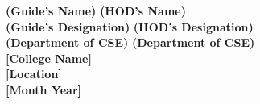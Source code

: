 \documentclass[12pt, a4paper]{report}
\begin{document}
\begin{titlepage}
\begin{center}
\vspace{0.1in}
\textbf{(Guide's Name)} \hspace{2.7in} \textbf{(HOD's Name)}\\
\vspace{0.1in}
\textbf{(Guide's Designation)} \hspace{2in} \textbf{(HOD's Designation)}\\
\vspace{0.1in}
\textbf{(Department of CSE)} \hspace{2.1in} \textbf{(Department of CSE)}\\
\vspace{0.1in}
\textbf{[College Name]}\\
\vspace{0.1in}
\textbf{[Location]}\\
\vspace{0.1in}
\textbf{[Month Year]} %
\end{center}
\end{titlepage}
\end{document}

